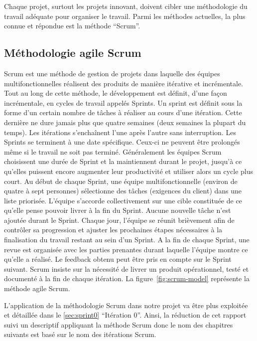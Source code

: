 Chaque projet, surtout les projets innovant, doivent cibler une méthodologie
du travail adéquate pour organiser le travail. Parmi les méthodes actuelles, la
plus connue et répondue est la méthode ``Scrum''.

\subsection{Méthodologie agile Scrum}


Scrum est une méthode de gestion de projets dans laquelle des équipes
multifonctionnelles réalisent des produits de manière itérative et
incrémentale. Tout au long de cette méthode, le développement est définit,
d'une façon incrémentale, en cycles de travail appelés Sprints. Un sprint est
définit sous la forme d'un certain nombre de tâches à réaliser au cours d'une
itération. Cette dernière ne dure jamais plus que quatre semaines (deux
semaines la plupart du temps). Les itérations s'enchaînent l'une après l'autre
sans interruption. Les Sprints se terminent à une date spécifique. Ceux-ci ne
peuvent être prolongés même si le travail ne soit pas terminé. Généralement les
équipes Scrum choisissent une durée de Sprint et la maintiennent durant le
projet, jusqu'à ce qu'elles puissent encore augmenter leur productivité et
utiliser alors un cycle plus court. Au début de chaque Sprint, une équipe
multifonctionnelle (environ de quatre à sept personnes) sélectionne des tâches
(exigences du client) dans une liste priorisée. L'équipe s'accorde
collectivement sur une cible constituée de ce qu'elle pense pouvoir livrer à la
fin du Sprint. Aucune nouvelle tâche n'est ajoutée durant le Sprint. Chaque
jour, l'équipe se réunit brièvement afin de contrôler sa progression et ajuster
les prochaines étapes nécessaires à la finalisation du travail restant au sein
d'un Sprint. A la fin de chaque Sprint, une revue est organisée avec les
parties prenantes durant laquelle l'équipe montre ce qu'elle a réalisé. Le
feedback obtenu peut être pris en compte sur le Sprint suivant. Scrum insiste
sur la nécessité de livrer un produit opérationnel, testé et documenté à la fin
de chaque itération. La figure~\ref{fig:scrum-model} représente la méthode
agile Scrum.

L'application de la méthodologie Scrum dans notre projet 
va être plus exploitée et détaillée dans le \autoref{sec:sprint0} ``Itération
0''. Ainsi, la réduction de cet rapport suivi un descriptif appliquant la
méthode Scrum donc le nom des chapitres suivants est basé sur le nom des
itérations Scrum.

